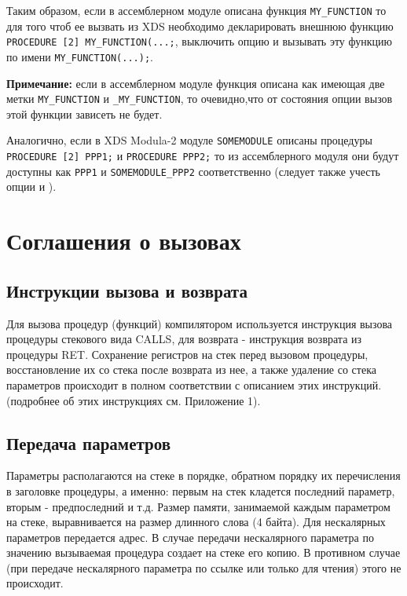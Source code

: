     Таким образом, если в ассемблерном модуле описана функция \verb'MY_FUNCTION'
  то для того чтоб ее вызвать из XDS необходимо декларировать внешнюю
  функцию \verb'PROCEDURE [2] MY_FUNCTION(...;', выключить опцию 
   и вызывать эту функцию по имени \verb'MY_FUNCTION(...);'.

  {\bf Примечание:} если в ассемблерном модуле функция описана как имеющая две
  метки \verb'MY_FUNCTION' и \verb'_MY_FUNCTION', то очевидно,что от состояния
  опции  вызов этой функции зависеть не будет.

  Аналогично, если в XDS Modula-2 модуле \verb'SOMEMODULE' описаны процедуры
  \verb'PROCEDURE [2] PPP1;' и \verb'PROCEDURE PPP2;' то из ассемблерного модуля они будут 
  доступны как \verb'PPP1' и \verb'SOMEMODULE_PPP2' соответственно (следует 
  также учесть опции  и ).
    
\section{Соглашения о вызовах}
\label{vaxlink:calls}

\subsection{Инструкции вызова и возврата}

    Для вызова процедур (функций) компилятором используется инструкция вызова
  процедуры стекового вида CALLS, для возврата - инструкция возврата из
  процедуры RET. Сохранение регистров на стек перед вызовом процедуры,
  восстановление их со стека после возврата из нее, а также удаление со
  стека параметров происходит в полном соответствии с описанием этих
  инструкций. (подробнее об этих инструкциях см. Приложение 1).

\subsection{Передача параметров}

    Параметры располагаются на стеке в порядке, обратном порядку их 
  перечисления в заголовке процедуры, а именно: первым на стек кладется
  последний параметр, вторым - предпоследний и т.д. Размер памяти, занимаемой
  каждым параметром на стеке, выравнивается на размер длинного слова (4 байта). 
  Для нескалярных параметров передается адрес. В случае передачи нескалярного
  параметра по значению вызываемая процедура создает на стеке его копию. В
  противном случае (при передаче нескалярного параметра по ссылке или только
  для чтения) этого не происходит.
    
